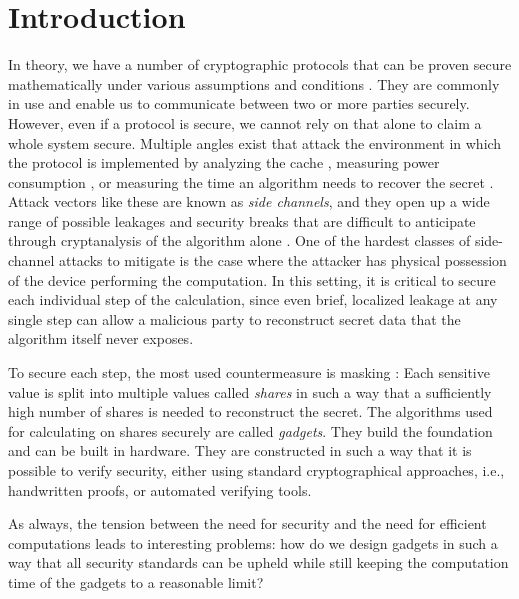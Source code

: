 \documentclass[english, version-2020-11]{uzl-thesis}
\newcommand{\ie}[0]{i.e.,\xspace}
\begin{document}
  \chapter{Introduction}  
 
In theory, we have a number of cryptographic protocols that can be proven secure mathematically under various assumptions and conditions \cite{Dowling2021TLS13}\cite{OneTimePad}. They are commonly in use and enable us to communicate between two or more parties securely. However, even if a protocol is secure, we cannot rely on that alone to claim a whole system secure. Multiple angles exist that attack the environment in which the protocol is implemented by analyzing the cache \cite{AESSidechannel}, measuring power consumption \cite{EisenbarthPowerAnalysis}\cite{RandolphPowerAnalysis}, or measuring the time an algorithm needs to recover the secret \cite{KocherPowerAttacks}. Attack vectors like these are known as \textit{side channels}, and they open up a wide range of possible leakages and security breaks that are difficult to anticipate through cryptanalysis of the algorithm alone \cite{KocherPowerAttacks}. One of the hardest classes of side-channel attacks to mitigate is the case where the attacker has physical possession of the device performing the computation\cite{AndersonTamperResistance}. In this setting, it is critical to secure each individual step of the calculation, since even brief, localized leakage at any single step can allow a malicious party to reconstruct secret data that the algorithm itself never exposes\cite{IshaiCircuits}.

To secure each step, the most used countermeasure is masking \cite{BerndtBuyOneGetOneForFree}: Each sensitive value is split into multiple values called \emph{shares} in such a way that a sufficiently high number of shares is needed to reconstruct the secret. The algorithms used for calculating on shares securely are called \emph{gadgets}. They build the foundation and can be built in hardware. They are constructed in such a way that it is possible to verify security, either using standard cryptographical approaches, \ie handwritten proofs, or automated verifying tools.


As always, the tension between the need for security and the need for efficient computations leads to interesting problems: how do we design gadgets in such a way that all security standards can be upheld while still keeping the computation time of the gadgets to a reasonable limit?
\end{document}
